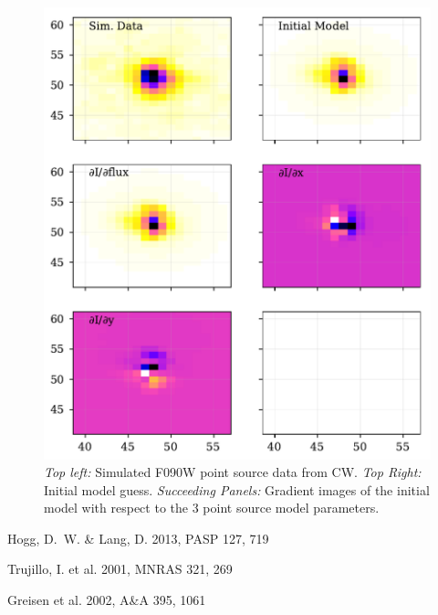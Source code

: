 \documentclass[modern]{aastex6}
\begin{document}
\begin{figure}
\includegraphics[width=\textwidth]{figures/demo_f090w_pointsource.pdf}
\caption{{\it Top left: } Simulated F090W point source data from CW.  
{\it Top Right:} Initial model guess.  
{\it Succeeding Panels:} Gradient images of the initial model with respect to the 3 point source model parameters.
\label{fig:f090w}}
\end{figure}



\begin{thebibliography}{}\raggedright

Hogg, D.~W. \& Lang, D. 2013, PASP 127, 719

Trujillo, I. et al. 2001, MNRAS 321, 269

Greisen et al. 2002, A\&A 395, 1061

\end{thebibliography}
\end{document}
